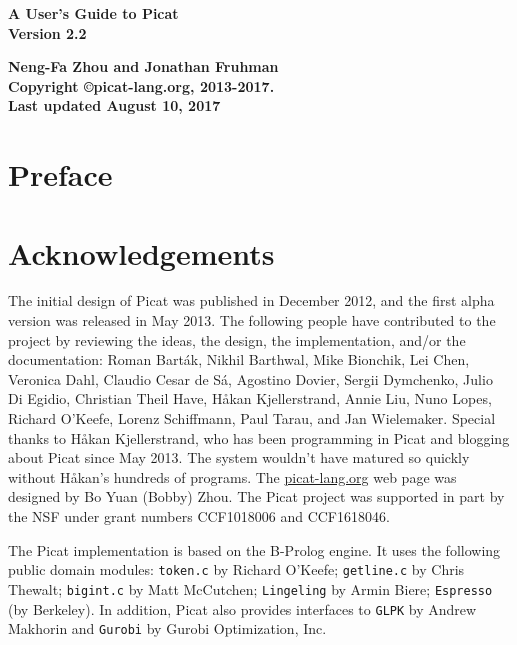 \documentclass[11pt]{report}
\newcommand{\ignore}[1]{}
\begin{document}
\vspace*{4cm}
\begin{center}
{\Huge\bf A User's Guide to Picat} \\
{\large\bf Version 2.2} \\



\vspace*{8cm}

{\large\bf Neng-Fa Zhou and Jonathan Fruhman} \\
\vspace*{1cm}
{\bf Copyright \copyright picat-lang.org, 2013-2017.} \\
{\bf Last updated August 10, 2017} \\
\end{center}
\thispagestyle{empty}
\clearpage

\pagestyle{plain}

\section*{Preface}


\section*{Acknowledgements}
The initial design of Picat was published in December 2012, and the first alpha version was released in May 2013.  The following people have contributed to the project by reviewing the ideas, the design, the implementation, and/or the documentation: Roman Bart\'{a}k, Nikhil Barthwal, Mike Bionchik, Lei Chen, Veronica Dahl, Claudio Cesar de S\'{a}, Agostino Dovier, Sergii Dymchenko, Julio Di Egidio, Christian Theil Have, H{\aa}kan Kjellerstrand,  Annie Liu, Nuno Lopes, Richard O'Keefe, Lorenz Schiffmann, Paul Tarau, and Jan Wielemaker.  Special thanks to H{\aa}kan Kjellerstrand, who has been programming in Picat and blogging about Picat since May 2013. The system wouldn't have matured so quickly without H{\aa}kan's hundreds of programs. The \url{picat-lang.org} web page was designed by Bo Yuan (Bobby) Zhou. The Picat project was supported in part by the NSF under grant numbers CCF1018006 and CCF1618046.

The Picat implementation is based on the B-Prolog engine. It uses the following public domain modules: \ignore{\texttt{prism} by Taisuke Sato and Yoshitaka Kameya; }\texttt{token.c} by Richard O'Keefe; \texttt{getline.c} by Chris Thewalt; \texttt{bigint.c} by Matt McCutchen; \texttt{Lingeling} by Armin Biere; \ignore{\texttt{MiniSAT} by Niklas Sorensson; \texttt{GLPK} by Andrew Makhorin; }\texttt{Espresso} (by Berkeley). In addition, Picat also provides interfaces to \texttt{GLPK} by Andrew Makhorin and \texttt{Gurobi} by Gurobi Optimization, Inc.
\end{document}
